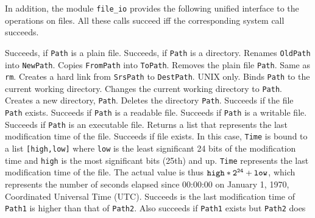 In addition, the module {\tt file\_io} provides the following unified
interface to the operations on files. All these calls succeed iff the
corresponding system call succeeds.
\begin{description}
  Succeeds, if {\tt Path} is a plain file.
  Succeeds, if {\tt Path} is a directory.
  Renames {\tt OldPath} into {\tt NewPath}.
  Copies {\tt FromPath} into {\tt ToPath}.
  Removes the plain file {\tt Path}.
  Same as {\tt rm}.
  Creates a hard link from {\tt SrsPath} to {\tt DestPath}. UNIX only.
  Binds {\tt Path} to the current working directory.
  Changes the current working directory to {\tt Path}.
  Creates a new directory, {\tt Path}.
  Deletes the directory {\tt Path}.
  Succeeds if the file {\tt Path} exists.
  Succeeds if {\tt Path} is a readable file.
  Succeeds if {\tt Path} is a writable file.
  Succeeds if {\tt Path} is an executable file.
  Returns a list that represents the last modification time of the file.
  Succeeds if file exists. In this case, {\tt Time} is bound to a list
  {\tt [high,low]} where {\tt low} is the least significant 24 bits of the
  modification time and {\tt high} is the most significant bits (25th) and up.
  {\tt Time} represents the last modification time of the file.
  The actual value is thus $\tt high*2^{24} + low$, which represents the
  number of seconds elapsed since 00:00:00 on
       January 1, 1970, Coordinated Universal Time (UTC).
  Succeeds is the last modification time of {\tt Path1} is higher than that
  of {\tt Path2}. Also succeeds if {\tt Path1} exists but {\tt Path2} does

\end{description}
